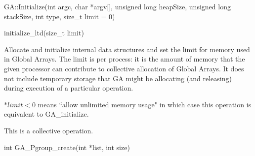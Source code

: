 \documentclass[12pt]{article}
\begin{document}
\begin{cxxapi}
\begin{cxxcode}
GA::Initialize(int argc, char *argv[], unsigned long heapSize,
               unsigned long stackSize, int type, size_t limit = 0)
\end{cxxcode}
\begin{funcargs}
\end{funcargs}
\end{cxxapi}

\begin{pyapi}
\begin{pycode}
initialize_ltd(size_t limit)
\end{pycode}
\end{pyapi}

\gcoll

\begin{desc}

Allocate and initialize internal data structures and set the limit for memory
used in Global Arrays. The limit is per process: it is the amount of memory
that the given processor can contribute to collective allocation of Global
Arrays. It does not include temporary storage that GA might be allocating (and
releasing) during execution of a particular operation.

$*limit < 0$ means ``allow unlimited memory usage" in which case this operation
is equivalent to GA_initialize.

This is a collective operation.

\end{desc}



\begin{capi}
\begin{ccode}
int GA_Pgroup_create(int *list, int size)
\end{ccode}
\begin{funcargs}
\end{funcargs}
\end{capi}
\end{document}
